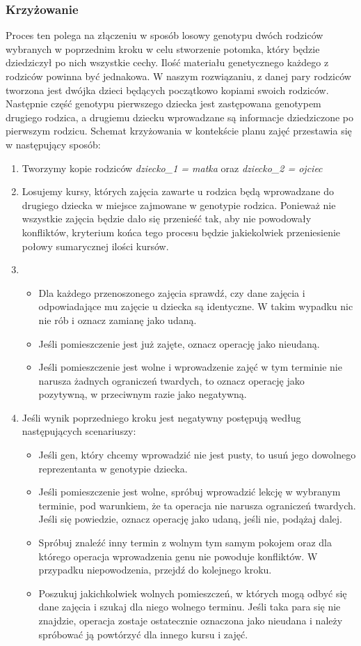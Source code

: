 \subsubsection{Krzyżowanie}
Proces ten polega na złączeniu w sposób losowy genotypu dwóch rodziców wybranych w poprzednim kroku w celu stworzenie potomka, który będzie dziedziczył po nich wszystkie cechy. Ilość materiału genetycznego każdego z rodziców powinna być jednakowa. W naszym rozwiązaniu, z danej pary rodziców tworzona jest dwójka dzieci będących początkowo kopiami swoich rodziców. Następnie część genotypu pierwszego dziecka jest zastępowana genotypem drugiego rodzica, a drugiemu dziecku wprowadzane są informacje dziedziczone po pierwszym rodzicu. Schemat krzyżowania w kontekście planu zajęć przestawia się w następujący sposób:
\begin{enumerate}
\item Tworzymy kopie rodziców \emph{dziecko_1 = matka} oraz \emph{dziecko_2 = ojciec}
\item Losujemy kursy, których zajęcia zawarte u rodzica będą wprowadzane do drugiego dziecka w miejsce zajmowane w genotypie rodzica. Ponieważ nie wszystkie zajęcia będzie dało się przenieść tak, aby nie powodowały konfliktów, kryterium końca tego procesu będzie jakiekolwiek przeniesienie połowy sumarycznej ilości kursów.
\item 
\begin{itemize}
\item Dla każdego przenoszonego zajęcia sprawdź, czy dane zajęcia i odpowiadające mu zajęcie u dziecka są identyczne. W takim wypadku nic nie rób i oznacz zamianę jako udaną.
\item Jeśli pomieszczenie jest już zajęte, oznacz operację jako nieudaną.
\item Jeśli pomieszczenie jest wolne i wprowadzenie zajęć w tym terminie nie narusza żadnych ograniczeń twardych, to oznacz operację jako pozytywną, w przeciwnym razie jako negatywną.
\end{itemize}
\item Jeśli wynik poprzedniego kroku jest negatywny postępują według następujących scenariuszy:
\begin{itemize}
\item Jeśli gen, który chcemy wprowadzić nie jest pusty, to usuń jego dowolnego reprezentanta w genotypie dziecka.
\item Jeśli pomieszczenie jest wolne, spróbuj wprowadzić lekcję w wybranym terminie, pod warunkiem, że ta operacja nie narusza ograniczeń twardych. Jeśli się powiedzie, oznacz operację jako udaną, jeśli nie, podążaj dalej.
\item Spróbuj znaleźć inny termin z wolnym tym samym pokojem oraz dla którego operacja wprowadzenia genu nie powoduje konfliktów. W przypadku niepowodzenia, przejdź do kolejnego kroku.
\item Poszukuj jakichkolwiek wolnych pomieszczeń, w których mogą odbyć się dane zajęcia i szukaj dla niego wolnego terminu. Jeśli taka para się nie znajdzie, operacja zostaje ostatecznie oznaczona jako nieudana i należy spróbować ją powtórzyć dla innego kursu i zajęć.
\end{itemize}
\end{enumerate}
